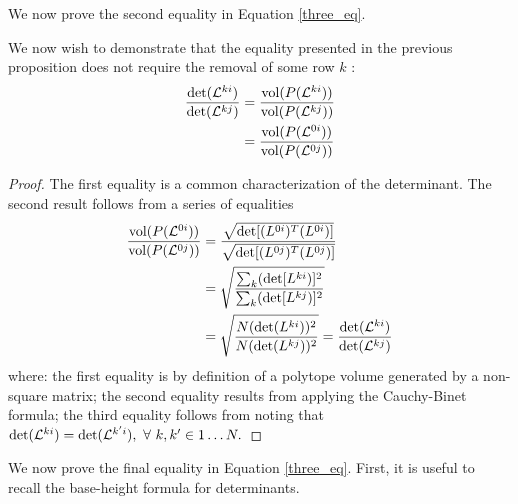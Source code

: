 We now prove the second equality in Equation \ref{three_eq}.

\begin{prop}{We now wish to demonstrate that the equality presented in the previous proposition does not require the removal of some row $k$ \cite{Drucker2015}:
\[
\begin{aligned}
\frac{\det(\mathcal{L}^{ki})}{\det(\mathcal{L}^{kj})} &= \frac{{{\rm vol}(P(\mathcal{L}^{ki}))}}{{{\rm vol}(P(\mathcal{L}^{kj}))}}\\
&= \frac{{{\rm vol}(P(\mathcal{L}^{0i}))}}{{{\rm vol}(P(\mathcal{L}^{0j}))}}\\
\end{aligned}
\]
}
\begin{proof}
The first equality is a common characterization of the determinant.  The second result follows from a series of equalities 
\[
\begin{aligned}
\frac{{\rm vol}(P(\mathcal{L}^{0i}))}{{\rm vol}(P(\mathcal{L}^{0j}))} &= \frac{\sqrt{\det[(L^{0i})^T(L^{0i})]}}{\sqrt{\det[(L^{0j})^T(L^{0j})]}}\\
& = \sqrt{\frac{\sum_k (\det[L^{ki})]^2} {\sum_k (\det[L^{kj})]^2} }\\
& = \sqrt{\frac{N(\det(L^{ki}))^2} {N(\det(L^{kj}))^2} } = \frac{\det(\mathcal{L}^{ki})}{\det(\mathcal{L}^{kj})}\\
\end{aligned}
\]
where: the first equality is by definition of a polytope volume generated by a non-square matrix; the second equality results from applying the Cauchy-Binet formula; the third equality follows from noting that $\det(\mathcal{L}^{ki}) = \det(\mathcal{L}^{k'i}), \ \forall \ k,k' \in 1\ldots N.$
\end{proof}
\end{prop}

We now prove the final equality in Equation \ref{three_eq}.  First, it is useful to recall the base-height formula for determinants.

